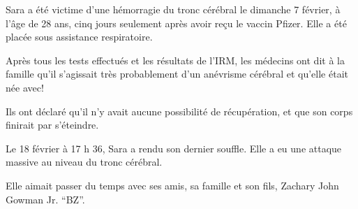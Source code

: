 Sara a été victime d'une hémorragie du tronc cérébral le dimanche 7 février, à
l'âge de 28 ans, cinq jours seulement après avoir reçu le vaccin Pfizer. Elle a
été placée sous assistance respiratoire.

Après tous les tests effectués et les résultats de l'IRM, les médecins ont dit à
la famille qu'il s'agissait très probablement d'un anévrisme cérébral et qu'elle
était née avec!

Ils ont déclaré qu'il n'y avait aucune possibilité de récupération, et que son
corps finirait par s'éteindre.

Le 18 février à 17 h 36, Sara a rendu son dernier souffle. Elle a eu une attaque
massive au niveau du tronc cérébral.

Elle aimait passer du temps avec ses amis, sa famille et son fils, Zachary John
Gowman Jr. “BZ”.

